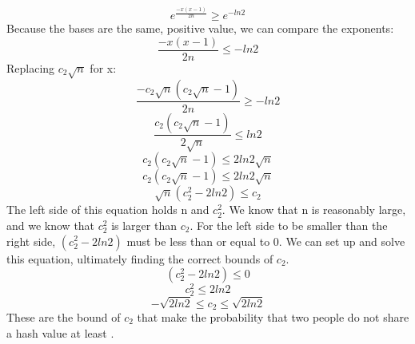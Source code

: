 \documentclass[11pt, solution, letterpaper]{format}
\begin{document}
\begin{equation*}
  e^{\frac{-x(x-1)}{2n}}
  \geq e^{-ln2}
\end{equation*}
Because the bases are the same, positive value, we can compare the exponents:
\begin{equation*}
  \frac{-x(x-1)}{2n}
  \leq -ln2
\end{equation*}
Replacing $c_2\sqrt{n}$ for x:
\begin{equation*}
  \frac{-c_2\sqrt{n}(c_2\sqrt{n} - 1)}{2n}
  \geq -ln2
\end{equation*}
\begin{equation*}
  \frac{c_2(c_2\sqrt{n} - 1)}{2\sqrt{n}}
  \leq ln2
\end{equation*}
\begin{equation*}
  c_2(c_2\sqrt{n} - 1)
  \leq 2ln2\sqrt{n}
\end{equation*}
\begin{equation*}
  c_2(c_2\sqrt{n} - 1)
  \leq 2ln2\sqrt{n}
\end{equation*}
\begin{equation*}
  \sqrt{n}(c_2^2 - 2ln2)
  \leq c_2
\end{equation*}
The left side of this equation holds n and $c_2^2$. We know that n is reasonably large, and we know that $c_2^2$ is larger than $c_2$. For the left side to be smaller than the right side, $(c_2^2 - 2ln2)$ must be less than or equal to 0. We can set up and solve this equation, ultimately finding the correct bounds of $c_2$. 
\begin{equation*}
  (c_2^2 - 2ln2)
  \leq 0
\end{equation*}
\begin{equation*}
  c_2^2 
  \leq 2ln2
\end{equation*}
\begin{equation*}
  -\sqrt{2ln2} \leq
  c_2 
  \leq \sqrt{2ln2}
\end{equation*}
These are the bound of $c_2$ that make the probability that two people do not share a hash value at least .



\clearpage
\end{document}
